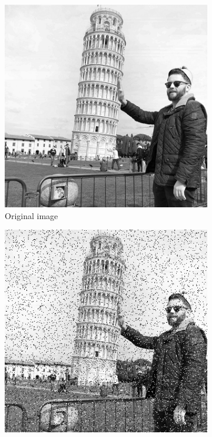 \begin{figure}[h!]
	\centering
	
	\begin{subfigure}{.3\textwidth}
		\includegraphics[width=\textwidth]{Iorig.png}
		\caption{Original image}
		\label{fig: LAPLAR1}
	\end{subfigure}
	\begin{subfigure}{.3\textwidth}
		\includegraphics[width=\textwidth]{Inoise.png}

\end{subfigure}
\end{figure}
